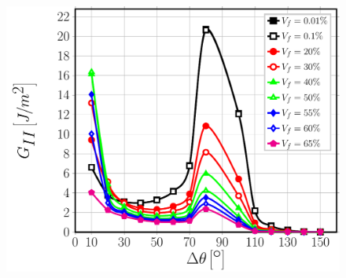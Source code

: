 \documentclass[first,firstsupp,lastsupp,last,hyperref,table]{ETHclass}
\begin{document}
\begin{frame}
\begin{columns}[c]
\begin{column}{0.5\textwidth}
\begin{figure}
\includegraphics[width=0.9\columnwidth]{GII-free-inclinedcrack.pdf}
\end{figure}
\end{column}
\end{columns}
\end{frame}
\end{document}
